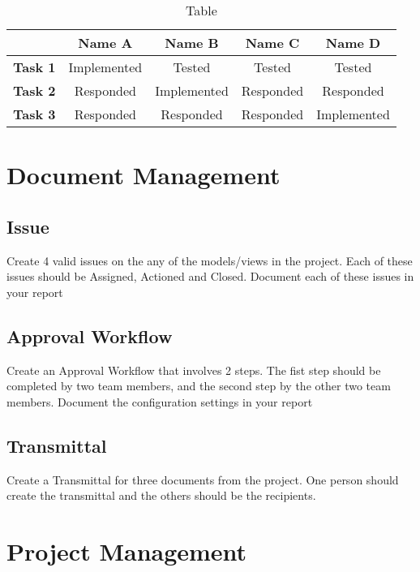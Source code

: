 \begin{table}[ht]
	\centering
	\begin{tabular}{|l|c|c|c|c|}
		\hline
		& \textbf{Name A} & \textbf{Name B} & \textbf{Name C} & \textbf{Name D} \\
		\hline
		\textbf{Task 1} & Implemented & Tested & Tested & Tested \\
		\hline
		\textbf{Task 2} & Responded & Implemented & Responded & Responded \\
		\hline
		\textbf{Task 3} & Responded & Responded & Responded & Implemented \\
		\hline
	
	\end{tabular}
	\caption{Table }
	\label{tab:AM}
\end{table}





\section{Document Management}

\subsection{Issue}

Create 4 valid issues on the any of the models/views in the project.  Each of these issues should be Assigned, Actioned and Closed.  Document each of these issues in your report

\subsection{Approval Workflow}

Create an Approval Workflow that involves 2 steps.  The fist step should be completed by two team members, and the second step by the other two team members.  Document the configuration settings in your report

\subsection{Transmittal}

Create a Transmittal for three documents from the project.  One person should create the transmittal and the others should be the recipients.


\section{Project Management}

